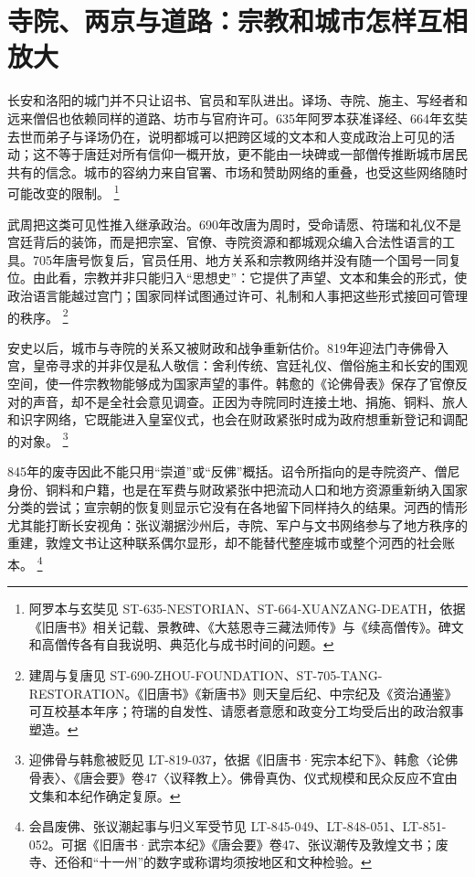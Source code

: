 \section{寺院、两京与道路：宗教和城市怎样互相放大}
\label{sec:religion-urban-exchange}

长安和洛阳的城门并不只让诏书、官员和军队进出。译场、寺院、施主、写经者和远来僧侣也依赖同样的道路、坊市与官府许可。635年阿罗本获准译经、664年玄奘去世而弟子与译场仍在，说明都城可以把跨区域的文本和人变成政治上可见的活动；这不等于唐廷对所有信仰一概开放，更不能由一块碑或一部僧传推断城市居民共有的信念。城市的容纳力来自官署、市场和赞助网络的重叠，也受这些网络随时可能改变的限制。%
\footnote{阿罗本与玄奘见 ST-635-NESTORIAN、ST-664-XUANZANG-DEATH，依据《旧唐书》相关记载、景教碑、《大慈恩寺三藏法师传》与《续高僧传》。碑文和高僧传各有自我说明、典范化与成书时间的问题。}

武周把这类可见性推入继承政治。690年改唐为周时，受命请愿、符瑞和礼仪不是宫廷背后的装饰，而是把宗室、官僚、寺院资源和都城观众编入合法性语言的工具。705年唐号恢复后，官员任用、地方关系和宗教网络并没有随一个国号一同复位。由此看，宗教并非只能归入“思想史”：它提供了声望、文本和集会的形式，使政治语言能越过宫门；国家同样试图通过许可、礼制和人事把这些形式接回可管理的秩序。%
\footnote{建周与复唐见 ST-690-ZHOU-FOUNDATION、ST-705-TANG-RESTORATION。《旧唐书》《新唐书》则天皇后纪、中宗纪及《资治通鉴》可互校基本年序；符瑞的自发性、请愿者意愿和政变分工均受后出的政治叙事塑造。}

安史以后，城市与寺院的关系又被财政和战争重新估价。819年迎法门寺佛骨入宫，皇帝寻求的并非仅是私人敬信：舍利传统、宫廷礼仪、僧俗施主和长安的围观空间，使一件宗教物能够成为国家声望的事件。韩愈的《论佛骨表》保存了官僚反对的声音，却不是全社会意见调查。正因为寺院同时连接土地、捐施、铜料、旅人和识字网络，它既能进入皇室仪式，也会在财政紧张时成为政府想重新登记和调配的对象。%
\footnote{迎佛骨与韩愈被贬见 LT-819-037，依据《旧唐书·宪宗本纪下》、韩愈〈论佛骨表〉、《唐会要》卷47〈议释教上〉。佛骨真伪、仪式规模和民众反应不宜由文集和本纪作确定复原。}

845年的废寺因此不能只用“崇道”或“反佛”概括。诏令所指向的是寺院资产、僧尼身份、铜料和户籍，也是在军费与财政紧张中把流动人口和地方资源重新纳入国家分类的尝试；宣宗朝的恢复则显示它没有在各地留下同样持久的结果。河西的情形尤其能打断长安视角：张议潮据沙州后，寺院、军户与文书网络参与了地方秩序的重建，敦煌文书让这种联系偶尔显形，却不能替代整座城市或整个河西的社会账本。%
\footnote{会昌废佛、张议潮起事与归义军受节见 LT-845-049、LT-848-051、LT-851-052。可据《旧唐书·武宗本纪》《唐会要》卷47、张议潮传及敦煌文书；废寺、还俗和“十一州”的数字或称谓均须按地区和文种检验。}

